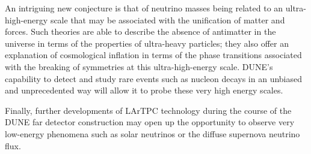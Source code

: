
An intriguing %
new conjecture is that of neutrino masses being related to an %
ultra-high-energy scale that may be associated with the unification of matter and forces. Such theories are able to describe the absence of antimatter in the universe in terms of the properties of ultra-heavy particles; they also %
offer an explanation %
of cosmological inflation in terms of the phase transitions associated with the breaking of symmetries at this ultra-high-energy scale. DUNE's capability to detect and study rare events such as nucleon decays in an unbiased and unprecedented way will allow it to probe these very high energy scales. 



Finally, further developments of LArTPC %
technology during the course of the DUNE far detector construction may open up the opportunity
to observe very low-energy phenomena  such as solar neutrinos or the diffuse supernova neutrino flux.



